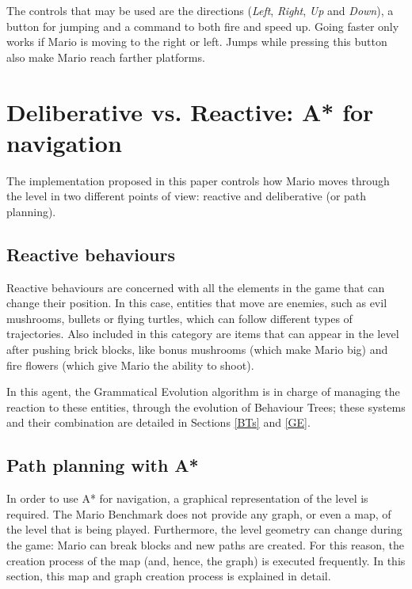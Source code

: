\documentclass[conference]{IEEEtran}
\begin{document}
The controls that may be used are the directions (\textit{Left}, \textit{Right}, 
\textit{Up} and \textit{Down}), a button 
for jumping and a command to both fire and speed up. Going faster only 
works if Mario is moving to the right or left. Jumps while pressing this button also 
make Mario reach farther platforms.


\section{Deliberative vs. Reactive: A* for navigation}

The implementation proposed in this paper controls how Mario moves through the level
in two different points of view: reactive and deliberative (or path planning).

\subsection{Reactive behaviours}

Reactive behaviours are concerned with all the elements in the
game that can change their position. In this case, entities that move are enemies, 
such as evil mushrooms, bullets or flying turtles, which can follow different 
types of trajectories. Also included in this category are
items that can appear in the level after pushing brick blocks, like bonus mushrooms
(which make Mario big) and fire flowers (which give Mario the ability to shoot).

In this agent, the Grammatical Evolution algorithm is in charge of managing the
reaction to these entities, through the evolution of Behaviour Trees; these
systems and their combination are detailed in Sections \ref{BTs} and \ref{GE}.


\subsection{Path planning with A*}

In order to use A* for navigation, a graphical representation of the level is
required. The Mario Benchmark does not provide any graph, or
even a map, of the level that is being played. Furthermore, the level geometry
can change during the game: 
Mario can break blocks and new paths are created. For this reason, 
the creation process of the map (and, hence, the graph) is executed frequently.
In this section, this map and graph creation process is explained in detail.
\end{document}
